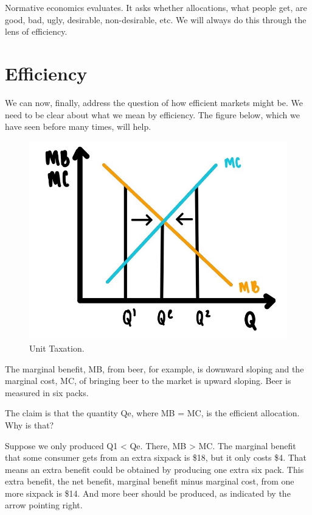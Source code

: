 \documentclass[
]{book}
\begin{document}
Normative economics evaluates. It asks whether allocations, what people get, are good, bad, ugly, desirable, non-desirable, etc. We will always do this through the lens of efficiency.

\hypertarget{efficiency}{%
\section{Efficiency}\label{efficiency}}

We can now, finally, address the question of how efficient markets might be. We need to be clear about what we mean by efficiency. The figure below, which we have seen before many times, will help.

\begin{figure}

{\centering \includegraphics[width=1\linewidth]{img/compmarkets/fig11} 

}

\caption{Unit Taxation.}\label{fig:compmarkets11}
\end{figure}

The marginal benefit, MB, from beer, for example, is downward sloping and the marginal cost, MC, of bringing beer to the market is upward sloping. Beer is measured in six packs.

The claim is that the quantity Qe, where MB = MC, is the efficient allocation. Why is that?

Suppose we only produced Q1 \textless{} Qe. There, MB \textgreater{} MC. The marginal benefit that some consumer gets from an extra sixpack is \$18, but it only costs \$4. That means an extra benefit could be obtained by producing one extra six pack. This extra benefit, the net benefit, marginal benefit minus marginal cost, from one more sixpack is \$14. And more beer should be produced, as indicated by the arrow pointing right.
\end{document}
